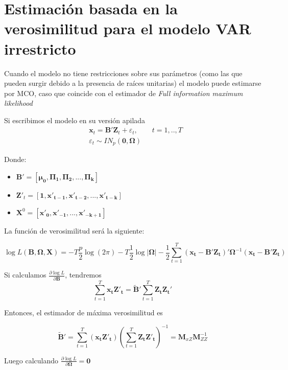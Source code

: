 \documentclass[12pt, twoside]{book}\usepackage[]{graphicx}\usepackage[]{color}
\numberwithin{equation}{section}
\numberwithin{theorem}{section}
\numberwithin{teorema}{section}
\numberwithin{defi}{section}
\numberwithin{prop}{section}
\numberwithin{defi}{section}
\theoremstyle{plain}
\begin{document}
\section{Estimación basada en la verosimilitud para el modelo VAR irrestricto}

Cuando el modelo no tiene restricciones sobre sus parámetros (como las que pueden surgir debido a la presencia de raíces unitarias) el modelo puede estimarse por MCO, caso que coincide con el estimador de \textit{Full information maximum likelihood}

Si escribimos el modelo en su versión apilada
\begin{align}
& \mathbf{x}_{t} = \mathbf{B'Z}_{t}+\varepsilon_{t}, \qquad t=1,..,T \\ 
& \varepsilon_{t}\sim IN_{p}(\mathbf{0,\Omega})
\end{align}

Donde: 
\begin{itemize}
\item $\mathbf{B'}=\left[\boldsymbol{\mu_{0}, \Pi_{1}, \Pi_{2},...,\Pi_{k}}\right]$
\item $\mathbf{Z'}_{t} = \left[\mathbf{1,x'_{t-1}, x'_{t-2},...,x'_{t-k}}\right]$
\item $\mathbf{X}^{0} = \left[\mathbf{x'_{0}, x'_{-1},...,x'_{-k+1}}\right]$ 
\end{itemize}

La función de verosimilitud será la siguiente: 

\begin{equation}
\log L(\boldsymbol{B,\Omega,X}) = -T\frac{p}{2}\log(2\pi)-T\frac{1}{2}\log|\mathbf{\Omega}|-\frac{1}{2}\sum_{t=1}^{T}(\mathbf{x_{t}-B'Z_{t}})'\boldsymbol{\Omega}^{-1}(\mathbf{x_{t}-B'Z_{t}})
\end{equation}

Si calculamos $\frac{\partial \log L}{\partial \mathbf{B}}$, tendremos
\begin{equation*}
\sum_{t=1}^{T}\mathbf{x_{t}Z'_{t}} = \mathbf{\tilde{B}'}\sum_{t=1}^{T}\mathbf{Z_{t}Z_{t}'}
\end{equation*}

Entonces, el estimador de máxima verosimilitud es 

\begin{equation}
\mathbf{\tilde{B}}' = \sum_{t=1}^{T}(\mathbf{x_{t}Z'_{t}})\left(\sum_{t=1}^{T}\mathbf{Z_{t}Z'_{t}}\right)^{-1} = \mathbf{M}_{xZ}\mathbf{M}_{ZZ}^{-1}
\end{equation}

Luego calculando $\frac{\partial \log L}{\partial \boldsymbol{\Omega}}=\mathbf{0}$
\end{document}
